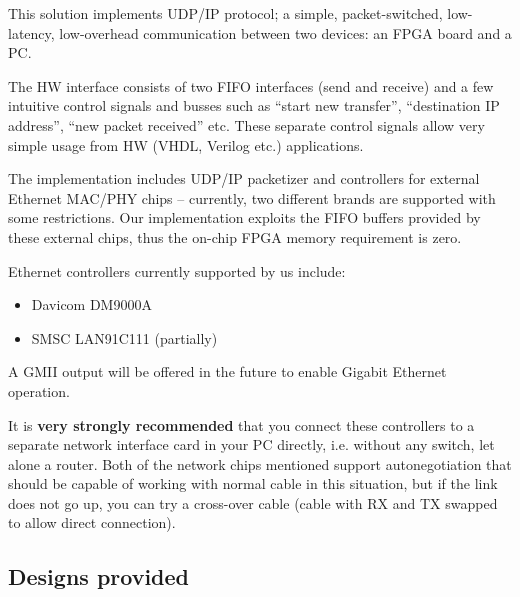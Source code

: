 \documentclass[a4paper,10pt,oneside,final]{article}
\begin{document}
This solution implements UDP/IP protocol; a simple, packet-switched, 
low-latency, low-overhead communication between
two devices: an FPGA board and a PC.

The HW interface consists of two FIFO interfaces (send and receive) and a 
few intuitive control signals and busses such as ``start new transfer'', 
``destination IP address'', ``new packet received'' etc. These separate
control signals allow very simple usage from HW (VHDL, Verilog etc.) 
applications.

The implementation includes UDP/IP packetizer and controllers for
external Ethernet MAC/PHY chips -- currently, two different brands are
supported with some restrictions. Our implementation exploits the FIFO
buffers provided by these external chips, thus the on-chip FPGA memory
requirement is zero.

Ethernet controllers currently supported by us include:
\begin{itemize}
\item Davicom DM9000A
\item SMSC LAN91C111 (partially)
\end{itemize}

A GMII output will be offered in the future to enable Gigabit Ethernet
operation.



It is \textbf{very strongly recommended} that you connect these
controllers to a separate network interface card in your PC directly,
i.e.  without any switch, let alone a router. Both of the network
chips mentioned support autonegotiation that should be capable of
working with normal cable in this situation, but if the link does not
go up, you can try a cross-over cable (cable with RX and TX swapped to
allow direct connection).

\subsection{Designs provided}
\end{document}
